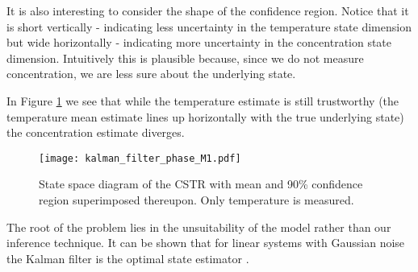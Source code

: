 It is also interesting to consider the shape of the confidence region. Notice that it is short vertically - indicating less uncertainty in the temperature state dimension but wide horizontally - indicating more uncertainty in the concentration state dimension. Intuitively this is plausible because, since we do not measure concentration, we are less sure about the underlying state. 

In Figure \ref{fig_kfphase} we see that while the temperature estimate is still trustworthy (the temperature mean estimate lines up horizontally with the true underlying state) the concentration estimate diverges.
\begin{figure}[H] 
\centering
\texttt{[image: kalman\_filter\_phase\_M1.pdf]}
\caption{State space diagram of the CSTR with mean and 90\% confidence region superimposed thereupon. Only temperature is measured.}
\label{fig_kfphase}
\end{figure}
The root of the problem lies in the unsuitability of the model rather than our inference technique. It can be shown that for linear systems with Gaussian noise the Kalman filter is the optimal state estimator \cite{shalom}. 

